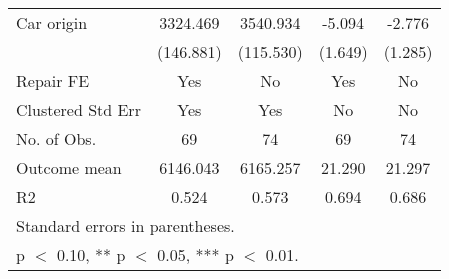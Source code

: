 \begin{table}[htbp]
\begin{tabular}{l*{4}{c}}
Car origin          &    3324.469\sym{**} &    3540.934\sym{**} &      -5.094\sym{***}&      -2.776\sym{**} \\
                    &   (146.881)         &   (115.530)         &     (1.649)         &     (1.285)         \\
\hline
Repair FE           &         Yes         &          No         &         Yes         &          No         \\
Clustered Std Err   &         Yes         &         Yes         &          No         &          No         \\
No. of Obs.         &          69         &          74         &          69         &          74         \\
Outcome mean        &    6146.043         &    6165.257         &      21.290         &      21.297         \\
R2                  &       0.524         &       0.573         &       0.694         &       0.686         \\
\hline\hline
\multicolumn{5}{l}{\footnotesize Standard errors in parentheses.}\\
\multicolumn{5}{l}{\footnotesize * p $<$ 0.10, ** p $<$ 0.05, *** p $<$ 0.01.}\\
\end{tabular}
\end{table}
